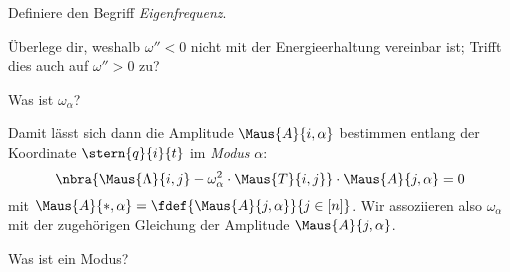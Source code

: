 \documentclass[../WiSe22ANA3.tex]{subfiles}
\begin{document}
			\begin{Aufgabe}
				\nr Definiere den Begriff \emph{Eigenfrequenz}. 
				
				\nr Überlege dir, weshalb $\omega''<0$ nicht mit der Energieerhaltung vereinbar ist; Trifft dies auch auf $\omega''>0$ zu?
				
				\nr Was ist $\omega_\alpha$? 
			\end{Aufgabe}
			Damit lässt sich dann die Amplitude $\Maus{A}{i,\alpha}$ bestimmen entlang der Koordinate $\stern{q}{i}{t}$ im \emph{Modus} $\alpha$:
			$$\nbra{\Maus{\Lambda}{i,j}-\omega_\alpha^2\cdot\Maus{T}{i,j}}\cdot\Maus{A}{j,\alpha}=0$$
			mit $\Maus{A}{*,\alpha}=\fdef{\Maus{A}{j,\alpha}}{j\in[n]}$. Wir assoziieren also $\omega_\alpha$ mit der zugehörigen Gleichung der Amplitude $\Maus{A}{j,\alpha}$. 
			\begin{Aufgabe}
				\nr Was ist ein Modus?
			\end{Aufgabe}
			
\end{document}
